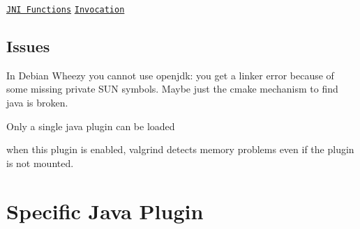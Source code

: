 \href{https://docs.oracle.com/javase/7/docs/technotes/guides/jni/spec/functions.html}{\tt J\+N\+I Functions} \href{https://docs.oracle.com/javase/7/docs/technotes/guides/jni/spec/invocation.html}{\tt Invocation}

\subsection*{Issues}


\begin{DoxyItemize}
\item In Debian Wheezy you cannot use openjdk\+: you get a linker error because of some missing private S\+U\+N symbols. Maybe just the cmake mechanism to find java is broken.
\item Only a single java plugin can be loaded
\item when this plugin is enabled, valgrind detects memory problems even if the plugin is not mounted.
\end{DoxyItemize}

\section*{Specific Java Plugin}